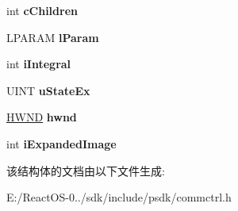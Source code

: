 \begin{DoxyCompactItemize}
int {\bfseries c\+Children}
\item 
\mbox{\label{structtag_t_v_i_t_e_m_e_x_w_a07df749412610be57b7bdd74f14ef404}} 
L\+P\+A\+R\+AM {\bfseries l\+Param}
\item 
\mbox{\label{structtag_t_v_i_t_e_m_e_x_w_a45eed25c154e4eb661347d12eded2873}} 
int {\bfseries i\+Integral}
\item 
\mbox{\label{structtag_t_v_i_t_e_m_e_x_w_a8d375db2a53cbe5e9412564e58265b6f}} 
U\+I\+NT {\bfseries u\+State\+Ex}
\item 
\mbox{\label{structtag_t_v_i_t_e_m_e_x_w_a358403da4f00704f2b00aebb5fe2b3ed}} 
\hyperlink{interfacevoid}{H\+W\+ND} {\bfseries hwnd}
\item 
\mbox{\label{structtag_t_v_i_t_e_m_e_x_w_a0e5b59b6e7d43051a1bf2e7c640be8ba}} 
int {\bfseries i\+Expanded\+Image}
\end{DoxyCompactItemize}


该结构体的文档由以下文件生成\+:\begin{DoxyCompactItemize}
\item 
E\+:/\+React\+O\+S-\/0../sdk/include/psdk/commctrl.\+h\end{DoxyCompactItemize}
